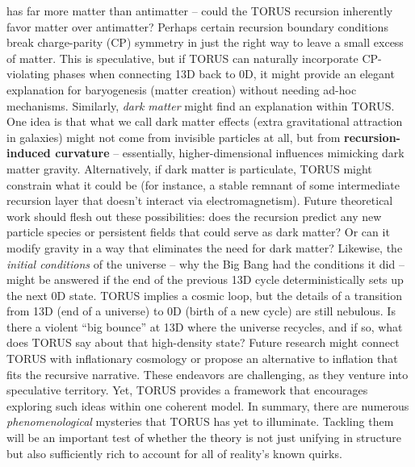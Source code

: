 \documentclass[
]{article}
\begin{document}
\begin{itemize}
  has far more matter than antimatter -- could the TORUS recursion
  inherently favor matter over antimatter? Perhaps certain recursion
  boundary conditions break charge-parity (CP) symmetry in just the
  right way to leave a small excess of matter\hspace{0pt}. This is
  speculative, but if TORUS can naturally incorporate CP-violating
  phases when connecting 13D back to 0D, it might provide an elegant
  explanation for baryogenesis (matter creation) without needing ad-hoc
  mechanisms. Similarly, \emph{dark matter} might find an explanation
  within TORUS. One idea is that what we call dark matter effects (extra
  gravitational attraction in galaxies) might not come from invisible
  particles at all, but from \textbf{recursion-induced curvature} --
  essentially, higher-dimensional influences mimicking dark matter
  gravity\hspace{0pt}. Alternatively, if dark matter is particulate,
  TORUS might constrain what it could be (for instance, a stable remnant
  of some intermediate recursion layer that doesn't interact via
  electromagnetism\hspace{0pt}). Future theoretical work should flesh
  out these possibilities: does the recursion predict any new particle
  species or persistent fields that could serve as dark matter? Or can
  it modify gravity in a way that eliminates the need for dark matter?
  Likewise, the \emph{initial conditions} of the universe -- why the Big
  Bang had the conditions it did -- might be answered if the end of the
  previous 13D cycle deterministically sets up the next 0D state. TORUS
  implies a cosmic loop, but the details of a transition from 13D (end
  of a universe) to 0D (birth of a new cycle) are still nebulous. Is
  there a violent ``big bounce'' at 13D where the universe recycles, and
  if so, what does TORUS say about that high-density state? Future
  research might connect TORUS with inflationary cosmology or propose an
  alternative to inflation that fits the recursive narrative. These
  endeavors are challenging, as they venture into speculative territory.
  Yet, TORUS provides a framework that encourages exploring such ideas
  within one coherent model. In summary, there are numerous
  \emph{phenomenological} mysteries that TORUS has yet to illuminate.
  Tackling them will be an important test of whether the theory is not
  just unifying in structure but also sufficiently rich to account for
  all of reality's known quirks.
\end{itemize}
\end{document}
